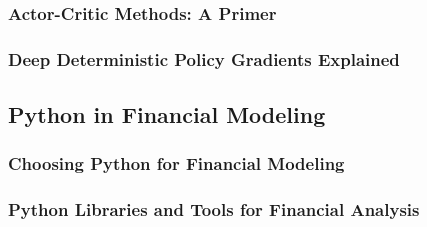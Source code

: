 \subsubsection{Actor-Critic Methods: A Primer}

\subsubsection{Deep Deterministic Policy Gradients Explained}

\subsection{Python in Financial Modeling}

\subsubsection{Choosing Python for Financial Modeling}

\subsubsection{Python Libraries and Tools for Financial Analysis}
